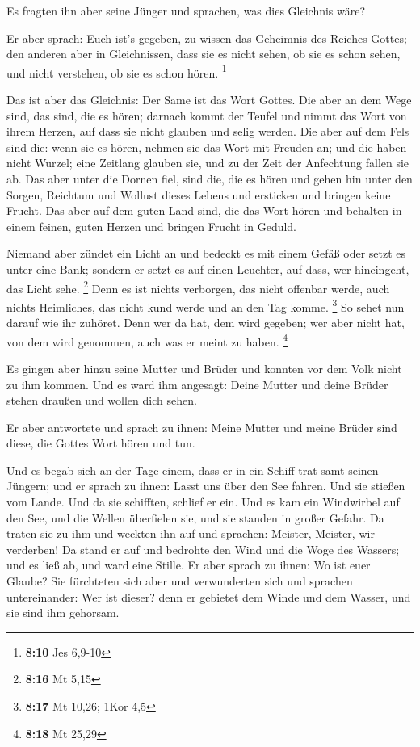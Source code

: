  Es fragten ihn aber seine Jünger und sprachen, was dies
Gleichnis wäre?

 Er aber sprach: Euch ist's gegeben, zu wissen das
Geheimnis des Reiches Gottes; den anderen aber in Gleichnissen, dass sie
es nicht sehen, ob sie es schon sehen, und nicht verstehen, ob sie es
schon hören. \footnote{\textbf{8:10} Jes 6,9-10}

 Das ist aber das Gleichnis: Der Same ist das Wort
Gottes.  Die aber an dem Wege sind, das sind, die es
hören; darnach kommt der Teufel und nimmt das Wort von ihrem Herzen, auf
dass sie nicht glauben und selig werden.  Die aber auf
dem Fels sind die: wenn sie es hören, nehmen sie das Wort mit Freuden
an; und die haben nicht Wurzel; eine Zeitlang glauben sie, und zu der
Zeit der Anfechtung fallen sie ab.  Das aber unter die
Dornen fiel, sind die, die es hören und gehen hin unter den Sorgen,
Reichtum und Wollust dieses Lebens und ersticken und bringen keine
Frucht.  Das aber auf dem guten Land sind, die das Wort
hören und behalten in einem feinen, guten Herzen und bringen Frucht in
Geduld.

 Niemand aber zündet ein Licht an und bedeckt es mit
einem Gefäß oder setzt es unter eine Bank; sondern er setzt es auf einen
Leuchter, auf dass, wer hineingeht, das Licht sehe. \footnote{\textbf{8:16}
  Mt 5,15}  Denn es ist nichts verborgen, das nicht
offenbar werde, auch nichts Heimliches, das nicht kund werde und an den
Tag komme. \footnote{\textbf{8:17} Mt 10,26; 1Kor 4,5} 
So sehet nun darauf wie ihr zuhöret. Denn wer da hat, dem wird gegeben;
wer aber nicht hat, von dem wird genommen, auch was er meint zu haben.
\footnote{\textbf{8:18} Mt 25,29}

 Es gingen aber hinzu seine Mutter und Brüder und konnten
vor dem Volk nicht zu ihm kommen.  Und es ward ihm
angesagt: Deine Mutter und deine Brüder stehen draußen und wollen dich
sehen.

 Er aber antwortete und sprach zu ihnen: Meine Mutter und
meine Brüder sind diese, die Gottes Wort hören und tun.

 Und es begab sich an der Tage einem, dass er in ein
Schiff trat samt seinen Jüngern; und er sprach zu ihnen: Lasst uns über
den See fahren. Und sie stießen vom Lande.  Und da sie
schifften, schlief er ein. Und es kam ein Windwirbel auf den See, und
die Wellen überfielen sie, und sie standen in großer Gefahr.
 Da traten sie zu ihm und weckten ihn auf und sprachen:
Meister, Meister, wir verderben! Da stand er auf und bedrohte den Wind
und die Woge des Wassers; und es ließ ab, und ward eine Stille.
 Er aber sprach zu ihnen: Wo ist euer Glaube? Sie
fürchteten sich aber und verwunderten sich und sprachen untereinander:
Wer ist dieser? denn er gebietet dem Winde und dem Wasser, und sie sind
ihm gehorsam.

